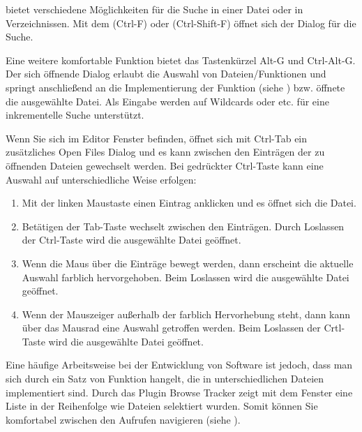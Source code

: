 
\codeblocks bietet verschiedene Möglichkeiten für die Suche in einer Datei oder in Verzeichnissen. Mit dem  (Ctrl-F) oder  (Ctrl-Shift-F) öffnet sich der Dialog für die Suche.

Eine weitere komfortable Funktion bietet das Tastenkürzel Alt-G und Ctrl-Alt-G. Der sich öffnende Dialog erlaubt die Auswahl von Dateien/Funktionen und springt anschließend an die Implementierung der Funktion (siehe ) bzw. öffnete die ausgewählte Datei. Als Eingabe werden auf Wildcards \codeline{*} oder  etc. für eine inkrementelle Suche unterstützt.



Wenn Sie sich im Editor Fenster befinden, öffnet sich mit Ctrl-Tab ein zusätzliches Open Files Dialog und es kann zwischen den Einträgen der zu öffnenden Dateien gewechselt werden. Bei gedrückter Ctrl-Taste kann eine  Auswahl auf unterschiedliche Weise erfolgen:

\begin{enumerate}
\item Mit der linken Maustaste einen Eintrag anklicken und es öffnet sich die Datei.
\item Betätigen der Tab-Taste wechselt zwischen den Einträgen. Durch Loslassen der Ctrl-Taste wird die ausgewählte Datei geöffnet.
\item Wenn die Maus über die Einträge bewegt werden, dann erscheint die aktuelle Auswahl farblich hervorgehoben. Beim Loslassen wird die ausgewählte Datei geöffnet.
\item Wenn der Mauszeiger außerhalb der farblich Hervorhebung steht, dann kann über das Mausrad eine Auswahl getroffen werden. Beim Loslassen der Crtl-Taste wird die ausgewählte Datei geöffnet.
\end{enumerate}

Eine häufige Arbeitsweise bei der Entwicklung von Software ist jedoch, dass man sich durch ein Satz von Funktion hangelt, die in unterschiedlichen Dateien implementiert sind. Durch das Plugin Browse Tracker zeigt mit dem Fenster  eine Liste in der Reihenfolge wie Dateien selektiert wurden. Somit können Sie komfortabel zwischen den Aufrufen navigieren (siehe ).

